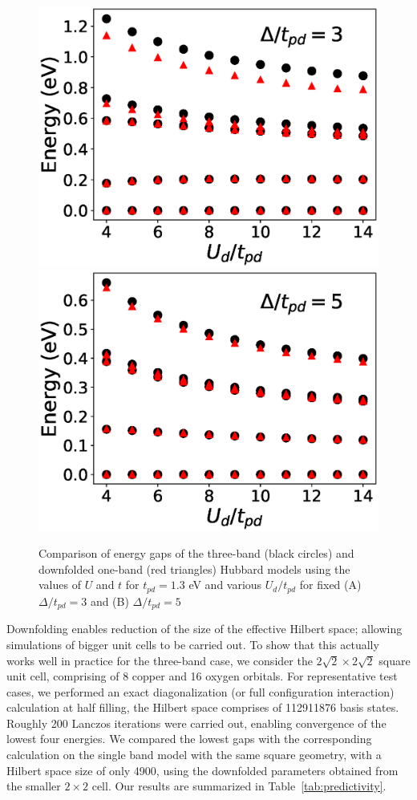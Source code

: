 \begin{figure}
\centering
\includegraphics[width=0.49\linewidth]{./Figures/lowenergy_1and3_vs_Ud_ep_3.eps}
\includegraphics[width=0.49\linewidth]{./Figures/lowenergy_1and3_vs_Ud_ep_5.eps}
\caption{Comparison of energy gaps of the three-band (black circles) and downfolded 
one-band (red triangles) Hubbard models using the 
values of $U$ and $t$ for $t_{pd}=1.3$ eV and various $U_{d}/t_{pd}$ for 
fixed (A) $\Delta/t_{pd}=3$ and (B) $\Delta/t_{pd}=5$}
\label{fig:energyfit} 
\end{figure}	
Downfolding enables reduction of the size of the effective Hilbert space; allowing 
simulations of bigger unit cells to be carried out. To show that this actually works well in practice for the three-band case, 
we consider the $2\sqrt{2} \times 2 \sqrt{2}$ square unit cell, comprising of 8 copper and 16 oxygen orbitals. 
For representative test cases, we performed an exact diagonalization 
(or full configuration interaction) calculation at half filling, the Hilbert space comprises of 112911876 basis states. 
Roughly 200 Lanczos iterations were carried out, enabling convergence of the lowest four energies. 
We compared the lowest gaps with the corresponding calculation on the single 
band model with the same square geometry, with a Hilbert space size of only 4900, 
using the downfolded parameters obtained from the smaller $2 \times 2$ cell. Our results are summarized 
in Table~\ref{tab:predictivity}. 


